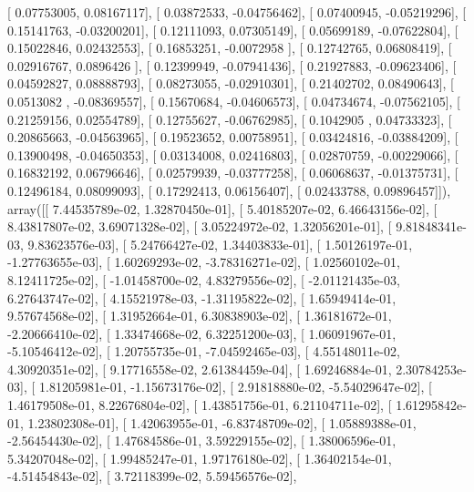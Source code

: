 \documentclass{article}
\begin{document}
       [ 0.07753005,  0.08167117],
       [ 0.03872533, -0.04756462],
       [ 0.07400945, -0.05219296],
       [ 0.15141763, -0.03200201],
       [ 0.12111093,  0.07305149],
       [ 0.05699189, -0.07622804],
       [ 0.15022846,  0.02432553],
       [ 0.16853251, -0.0072958 ],
       [ 0.12742765,  0.06808419],
       [ 0.02916767,  0.0896426 ],
       [ 0.12399949, -0.07941436],
       [ 0.21927883, -0.09623406],
       [ 0.04592827,  0.08888793],
       [ 0.08273055, -0.02910301],
       [ 0.21402702,  0.08490643],
       [ 0.0513082 , -0.08369557],
       [ 0.15670684, -0.04606573],
       [ 0.04734674, -0.07562105],
       [ 0.21259156,  0.02554789],
       [ 0.12755627, -0.06762985],
       [ 0.1042905 ,  0.04733323],
       [ 0.20865663, -0.04563965],
       [ 0.19523652,  0.00758951],
       [ 0.03424816, -0.03884209],
       [ 0.13900498, -0.04650353],
       [ 0.03134008,  0.02416803],
       [ 0.02870759, -0.00229066],
       [ 0.16832192,  0.06796646],
       [ 0.02579939, -0.03777258],
       [ 0.06068637, -0.01375731],
       [ 0.12496184,  0.08099093],
       [ 0.17292413,  0.06156407],
       [ 0.02433788,  0.09896457]]), array([[  7.44535789e-02,   1.32870450e-01],
       [  5.40185207e-02,   6.46643156e-02],
       [  8.43817807e-02,   3.69071328e-02],
       [  3.05224972e-02,   1.32056201e-01],
       [  9.81848341e-03,   9.83623576e-03],
       [  5.24766427e-02,   1.34403833e-01],
       [  1.50126197e-01,  -1.27763655e-03],
       [  1.60269293e-02,  -3.78316271e-02],
       [  1.02560102e-01,   8.12411725e-02],
       [ -1.01458700e-02,   4.83279556e-02],
       [ -2.01121435e-03,   6.27643747e-02],
       [  4.15521978e-03,  -1.31195822e-02],
       [  1.65949414e-01,   9.57674568e-02],
       [  1.31952664e-01,   6.30838903e-02],
       [  1.36181672e-01,  -2.20666410e-02],
       [  1.33474668e-02,   6.32251200e-03],
       [  1.06091967e-01,  -5.10546412e-02],
       [  1.20755735e-01,  -7.04592465e-03],
       [  4.55148011e-02,   4.30920351e-02],
       [  9.17716558e-02,   2.61384459e-04],
       [  1.69246884e-01,   2.30784253e-03],
       [  1.81205981e-01,  -1.15673176e-02],
       [  2.91818880e-02,  -5.54029647e-02],
       [  1.46179508e-01,   8.22676804e-02],
       [  1.43851756e-01,   6.21104711e-02],
       [  1.61295842e-01,   1.23802308e-01],
       [  1.42063955e-01,  -6.83748709e-02],
       [  1.05889388e-01,  -2.56454430e-02],
       [  1.47684586e-01,   3.59229155e-02],
       [  1.38006596e-01,   5.34207048e-02],
       [  1.99485247e-01,   1.97176180e-02],
       [  1.36402154e-01,  -4.51454843e-02],
       [  3.72118399e-02,   5.59456576e-02],
\end{document}
